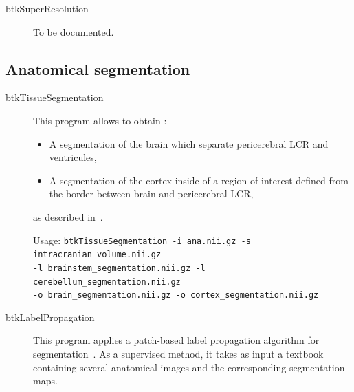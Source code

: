 \begin{description}
 \item[btkSuperResolution] To be documented. 

\end{description}

\subsection{Anatomical segmentation}
\label{subsec:ana_seg}

\begin{description}
 \item[btkTissueSegmentation] This program allows to obtain :
        \begin{itemize}
         \item A segmentation of the brain which separate pericerebral LCR and ventricules,
         \item A segmentation of the cortex inside of a region of interest defined from the border between brain and pericerebral LCR,
        \end{itemize}
        as described in~\cite{caldairou_segmentation_2011}.
        
        Usage: \texttt{btkTissueSegmentation -i ana.nii.gz -s intracranian\_volume.nii.gz \\
        -l brainstem\_segmentation.nii.gz -l cerebellum\_segmentation.nii.gz \\
        -o brain\_segmentation.nii.gz -o cortex\_segmentation.nii.gz}
\end{description}

\begin{description}
 \item[btkLabelPropagation] This program applies a patch-based label propagation algorithm for segmentation~\cite{rousseau_supervised_2011}. As a supervised method, it takes as input a textbook containing several anatomical images and the corresponding segmentation maps.
\end{description}


